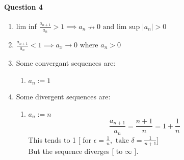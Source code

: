 \documentclass[20pt]{extarticle} %
\begin{document}
\paragraph{Question 4}
\begin{enumerate}[label=\Roman*]
	\item lim inf $ \frac{a_{n+1}}{a_n}>1 \implies a_n \nrightarrow 0 \text{ and }  \text{lim sup } |a_n|>0   $
	\item {}$ \frac{a_{n+1}}{a_n}<1 \implies a_x \rightarrow 0 \text{ where } a_n>0$
	\item Some convergant sequences are:
		\begin{enumerate}
			\item	$a_n:=1$
		\end{enumerate}
	\item Some divergent sequences are: \begin{enumerate}
		\item	$a_n := n$
			\[\frac{  a_{n+1} }{  a_n  }= \frac{n+1}{n}=1+ \frac{1}{n} \]
			This tends to 1 [ for $ \epsilon= \frac{1}{n} , \text{ take } \delta = \frac{1}{n+1}   $]\\
			But the sequence diverges [ to $\infty$  ].
	\end{enumerate}
\end{enumerate}
\end{document}

